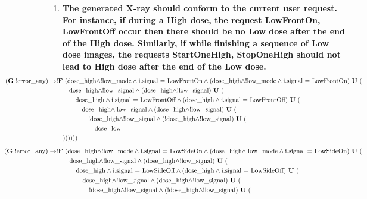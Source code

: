 \documentclass[a4paper,10pt]{article}
\newcommand{\LTLG}{\mathbf{G~}}
\newcommand{\LTLF}{\mathbf{F~}}
\newcommand{\LTLU}{\mathbf{~U~}}
\newcommand{\imply}{\rightarrow}
\newcommand{\doselow}{\textrm{dose\_low}}
\newcommand{\dosehigh}{\textrm{dose\_high}}
\newcommand{\lowsignal}{\textrm{low\_signal}}
\newcommand{\errorany}{\textrm{error\_any}}
\newcommand{\lowmode}{\textrm{low\_mode}}
\begin{document}
\begin{enumerate}
		\item \textbf{The generated X-ray should conform to the current user request. For instance, if during a High dose, the request LowFrontOn, LowFrontOff occur then there should be no Low dose after the end of the High dose. Similarly, if while finishing a sequence of Low dose images, the requests StartOneHigh, StopOneHigh should not lead to High dose after the end of the Low dose.}
			\begin{align*}
				&\hspace{-9em}(\LTLG !\errorany) \imply !\LTLF (\dosehigh \land !\lowmode \land \textrm{i.signal = LowFrontOn} \land (\dosehigh \land !\lowmode \land \textrm{i.signal = LowFrontOn}) \LTLU ( \\
				&	\hspace{1em}\dosehigh \land !\lowsignal \land (\dosehigh \land !\lowsignal) \LTLU ( \\
				&		\hspace{2em}\dosehigh \land \textrm{i.signal = LowFrontOff} \land (\dosehigh \land \textrm{i.signal = LowFrontOff}) \LTLU ( \\
				&			\hspace{3em}\dosehigh \land !\lowsignal \land (\dosehigh \land !\lowsignal) \LTLU ( \\
				&				\hspace{4em}!\dosehigh \land !\lowsignal \land (!\dosehigh \land !\lowsignal) \LTLU ( \\
				&					\hspace{5em}\doselow \\
				&))))))
			\end{align*}
			\begin{align*}
				&\hspace{-9em}(\LTLG !\errorany) \imply !\LTLF (\dosehigh \land !\lowmode \land \textrm{i.signal = LowSideOn} \land (\dosehigh \land !\lowmode \land \textrm{i.signal = LowSideOn}) \LTLU ( \\
				&	\hspace{1em}\dosehigh \land !\lowsignal \land (\dosehigh \land !\lowsignal) \LTLU ( \\
				&		\hspace{2em}\dosehigh \land \textrm{i.signal = LowSideOff} \land (\dosehigh \land \textrm{i.signal = LowSideOff}) \LTLU ( \\
				&			\hspace{3em}\dosehigh \land !\lowsignal \land (\dosehigh \land !\lowsignal) \LTLU ( \\
				&				\hspace{4em}!\dosehigh \land !\lowsignal \land (!\dosehigh \land !\lowsignal) \LTLU ( \\

\end{align*}
\end{enumerate}
\end{document}
